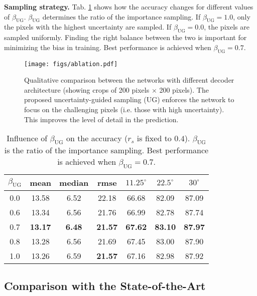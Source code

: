\documentclass[10pt,twocolumn,letterpaper]{article}
\begin{document}
\noindent
\textbf{Sampling strategy.} Tab. \ref{table:ablation_beta} shows how the accuracy changes for different values of $\beta_{\text{UG}}$. $\beta_{\text{UG}}$ determines the ratio of the importance sampling. If $\beta_{\text{UG}}=1.0$, only the pixels with the highest uncertainty are sampled. If $\beta_{\text{UG}}=0.0$, the pixels are sampled uniformly. Finding the right balance between the two is important for minimizing the bias in training. Best performance is achieved when $\beta_\text{UG}=0.7$. 

\begin{figure}[t]
\begin{center}
\texttt{[image: figs/ablation.pdf]}
\end{center}
\caption{Qualitative comparison between the networks with different decoder architecture (showing crops of 200 pixels $\times$ 200 pixels). The proposed uncertainty-guided sampling (UG) enforces the network to focus on the challenging pixels (i.e. those with high uncertainty). This improves the level of detail in the prediction.}
\label{fig:ablation1}
\end{figure}


\begin{table}[t]
\setlength\tabcolsep{1.5pt}
\begin{center}
\begin{tabular}{c|ccc|ccc}
\hline
\toprule
$\beta_{\text{UG}}$ & mean & median & rmse & $11.25^{\circ}$ & $22.5^{\circ}$ & $30^{\circ}$ \\
\midrule
0.0 & 13.58 & 6.52 & 22.18 & 66.68 & 82.09 & 87.09 \\
0.6 & 13.34 & 6.56 & 21.76 & 66.99 & 82.78 & 87.74 \\
0.7 & \textbf{13.17} & \textbf{6.48} & \textbf{21.57} & \textbf{67.62} & \textbf{83.10} & \textbf{87.97} \\
0.8 & 13.28 & 6.56 & 21.69 & 67.45 & 83.00 & 87.90 \\
1.0 & 13.26 & 6.59 & \textbf{21.57} & 67.16 & 82.98 & 87.92 \\
\bottomrule
\end{tabular}
\end{center}
\caption{Influence of $\beta_{\text{UG}}$ on the accuracy ($r_s$ is fixed to $0.4$). $\beta_{\text{UG}}$ is the ratio of the importance sampling. Best performance is achieved when $\beta_{\text{UG}}\!=\!0.7$.}
\label{table:ablation_beta}
\end{table}

\subsection{Comparison with the State-of-the-Art}
\end{document}
